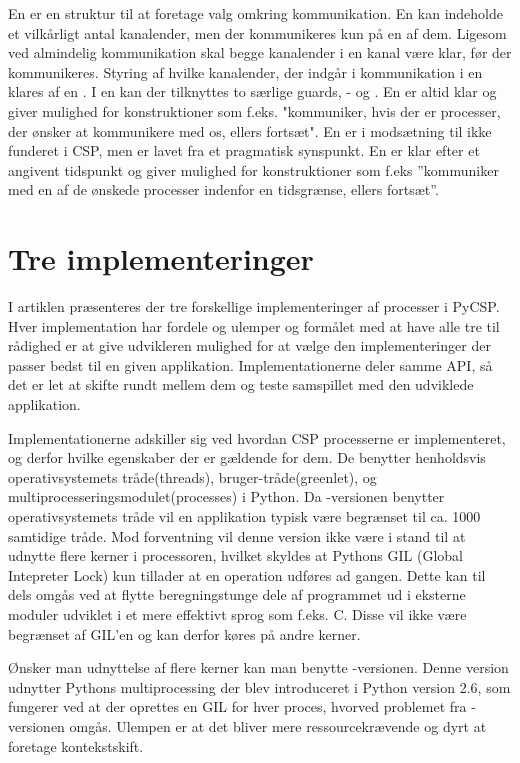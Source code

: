 En  er en struktur til at foretage valg omkring kommunikation. En  kan indeholde et vilkårligt antal kanalender, men der kommunikeres kun på en af dem. Ligesom ved almindelig kommunikation skal begge kanalender i en kanal være klar, før der kommunikeres. Styring af hvilke kanalender, der indgår i kommunikation i en   klares af en . I en  kan der tilknyttes to særlige guards, - og . En  er altid klar og giver mulighed for konstruktioner som f.eks. "kommuniker, hvis der er processer, der ønsker at kommunikere med os, ellers fortsæt". En  er i modsætning til  ikke funderet i CSP, men er lavet fra et pragmatisk synspunkt. En  er klar efter et angivent tidspunkt og giver mulighed for konstruktioner som f.eks ''kommuniker med en af de ønskede processer indenfor en tidsgrænse, ellers fortsæt''. 

\section{Tre implementeringer}
I artiklen \cite{Friborg2009} præsenteres der tre forskellige implementeringer af processer i PyCSP. Hver implementation har fordele og ulemper og formålet med at have alle tre til rådighed er at give udvikleren mulighed for at vælge den implementeringer der passer bedst til en given applikation. Implementationerne deler samme API, så det er let at skifte rundt mellem dem og teste samspillet med den udviklede applikation. 

Implementationerne adskiller sig ved hvordan CSP processerne er implementeret, og derfor hvilke egenskaber der er gældende for dem. De benytter henholdsvis operativsystemets tråde(threads), bruger-tråde(greenlet), og multiprocesseringsmodulet(processes) i Python. Da -versionen benytter operativsystemets tråde vil en applikation typisk være begrænset til ca. 1000 samtidige tråde\cite[3]{Friborg2009}. Mod forventning vil denne version ikke være i stand til at udnytte flere kerner i processoren, hvilket skyldes at Pythons GIL (Global Intepreter Lock) kun tillader at en operation udføres ad gangen. Dette kan til dels omgås ved at flytte beregningstunge dele af programmet ud i eksterne moduler udviklet i et mere effektivt sprog som f.eks. C. Disse vil ikke være begrænset af GIL'en og kan derfor køres på andre kerner. 

Ønsker man udnyttelse af flere kerner kan man benytte -versionen. Denne version udnytter Pythons multiprocessing der blev introduceret i Python version 2.6, som fungerer ved at der oprettes en GIL for hver proces, hvorved problemet fra -versionen omgås. Ulempen er at det bliver mere ressourcekrævende og dyrt at foretage kontekstskift. 

